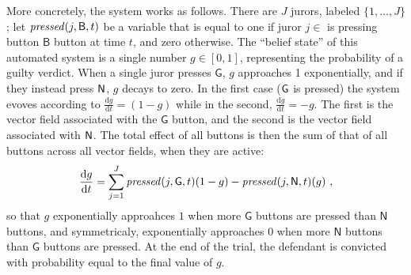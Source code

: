 \begin{subappendices}
\begin{example}
    More concretely, the system works as follows.
    There are $J$ jurors, labeled $\{1, \ldots, J\}$;
    let 
    $\pressed(j,B,t)$ be
    a variable that is equal to one if juror $j \in $
    is pressing button  $\mathsf B$ button at time $t$, and zero otherwise.
    The ``belief state'' of this automated system is
    a single number $g \in [0,1]$, representing the probability of a guilty verdict.
    When a single juror presses $\mathsf G$, $g$ approaches 1
    exponentially, and if they instead press $\sf N$, $g$ decays to zero.
    In the first case ($\sf G$ is pressed) the system evoves according to 
    $\frac{\mathrm dg}{\mathrm dt} = (1-g)$
    while in the second, 
    $\frac{\mathrm dg}{\mathrm dt} = -g$.
    The first is the vector field associated with the $\mathsf G$ button,
    and the second is the vector field associated with $\sf N$. 
    The total effect of all buttons is then the sum of that of all buttons across all vector fields, when they are active:
    \[
    	\frac{\mathrm dg}{\mathrm dt} = 
    	\sum_{j = 1}^J 
    		\pressed(j,G,t)
    		(1-g) 
    		-
    		\pressed(j,N,t)
    		(g)
    		~,
    \]
    so that $g$ exponentially approahces $1$ when more $\mathsf G$ buttons are pressed than $\mathsf N$ buttons,
    and symmetricaly, exponentially approaches $0$ when more $\mathsf N$ buttons than $\mathsf G$ buttons are pressed.
    At the end of the trial, the defendant is convicted with probability
    equal to the final value of $g$. 


\end{example}
\end{subappendices}
